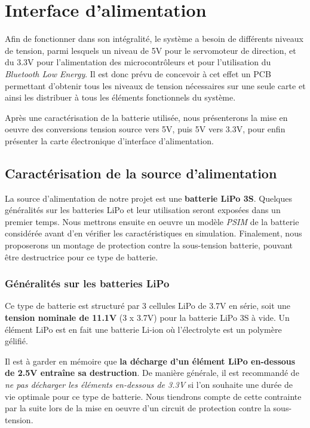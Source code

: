 \chapter{Interface d'alimentation}
		
Afin de fonctionner dans son intégralité, le système a besoin de 
différents niveaux de tension, parmi lesquels un niveau de 5V pour 
le servomoteur de direction, et du 3.3V pour l'alimentation des 
microcontrôleurs et pour l'utilisation du 
\textit{Bluetooth Low Energy}. 
Il est donc prévu de concevoir à cet effet un PCB permettant 
d'obtenir tous les niveaux de tension nécessaires sur une seule 
carte et ainsi les distribuer à tous les éléments fonctionnels du 
système. 
	
Après une caractérisation de la batterie utilisée, nous présenterons 
la mise en oeuvre des conversions tension source vers 5V, puis 5V 
vers 3.3V, pour enfin présenter la carte électronique d'interface	 
d'alimentation.
		
	\section{Caractérisation de la source d'alimentation}
			
	La source d'alimentation de notre projet est une 
	\textbf{batterie LiPo 3S}. Quelques généralités sur les batteries 
	LiPo et leur utilisation seront exposées dans un premier temps. 
	Nous mettrons ensuite en oeuvre un modèle \textit{PSIM} de la batterie
	considérée avant d'en vérifier les caractéristiques en simulation. 
	Finalement, nous proposerons un montage de protection contre la 
	sous-tension batterie, pouvant être destructrice pour ce type de 
	batterie.
		
		\subsection{Généralités sur les batteries LiPo}
		\label{batterie}	
		Ce type de batterie est structuré par 3 cellules LiPo de 3.7V en 
		série, soit une \textbf{tension nominale de 11.1V} (3 x 3.7V) pour 
		la batterie LiPo 3S à vide. Un élément LiPo est en fait une batterie 
		Li-ion où l'électrolyte est un polymère gélifié.
			
		Il est à garder en mémoire que \textbf{la décharge d'un élément LiPo 
		en-dessous de 2.5V entraîne sa destruction}. De manière générale, il 
		est recommandé de 
		\textit{ne pas décharger les éléments en-dessous de 3.3V} 
		si l'on souhaite une durée de vie optimale pour ce type de batterie.
		Nous tiendrons compte de cette contrainte par la suite lors de la
		mise en oeuvre d'un circuit de protection contre la sous-tension. 
			
